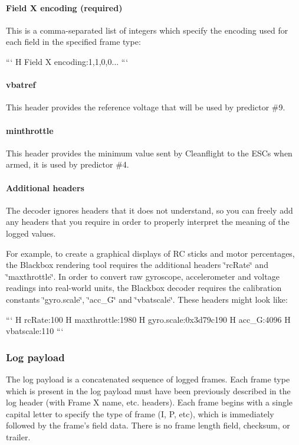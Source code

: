 \paragraph*{Field X encoding (required)}

This is a comma-\/separated list of integers which specify the encoding used for each field in the specified frame type\+:

``` H Field X encoding\+:1,1,0,0... ```

\paragraph*{vbatref}

This header provides the reference voltage that will be used by predictor \#9.

\paragraph*{minthrottle}

This header provides the minimum value sent by Cleanflight to the E\+S\+Cs when armed, it is used by predictor \#4.

\paragraph*{Additional headers}

The decoder ignores headers that it does not understand, so you can freely add any headers that you require in order to properly interpret the meaning of the logged values.

For example, to create a graphical displays of R\+C sticks and motor percentages, the Blackbox rendering tool requires the additional headers \char`\"{}rc\+Rate\char`\"{} and \char`\"{}maxthrottle\char`\"{}. In order to convert raw gyroscope, accelerometer and voltage readings into real-\/world units, the Blackbox decoder requires the calibration constants \char`\"{}gyro.\+scale\char`\"{}, \char`\"{}acc\+\_\+G\char`\"{} and \char`\"{}vbatscale\char`\"{}. These headers might look like\+:

``` H rc\+Rate\+:100 H maxthrottle\+:1980 H gyro.\+scale\+:0x3d79c190 H acc\+\_\+G\+:4096 H vbatscale\+:110 ```

\subsubsection*{Log payload}

The log payload is a concatenated sequence of logged frames. Each frame type which is present in the log payload must have been previously described in the log header (with Frame X name, etc. headers). Each frame begins with a single capital letter to specify the type of frame (I, P, etc), which is immediately followed by the frame's field data. There is no frame length field, checksum, or trailer.

